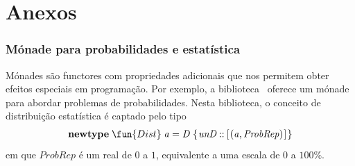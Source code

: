 \documentclass[a4paper]{article}
\newcommand{\Conid}[1]{\mathit{#1}}
\newcommand{\Varid}[1]{\mathit{#1}}
\begin{document}





\newpage

\part*{Anexos}

\appendix

\section{Mónade para probabilidades e estatística}\label{sec:Dist}
Mónades são functores com propriedades adicionais que nos permitem obter
efeitos especiais em progra\-mação. Por exemplo, a biblioteca \Probability\
oferece um mónade para abordar problemas de probabilidades. Nesta biblioteca,
o conceito de distribuição estatística é captado pelo tipo
\begin{eqnarray}
	\ensuremath{\mathbf{newtype}\;\fun{Dist}\;\Varid{a}\mathrel{=}\Conid{D}\;\{\mskip1.5mu \Varid{unD}\mathbin{::}[\mskip1.5mu (\Varid{a},\Conid{ProbRep})\mskip1.5mu]\mskip1.5mu\}}
	\label{eq:Dist}
\end{eqnarray}
em que \ensuremath{\Conid{ProbRep}} é um real de \ensuremath{\mathrm{0}} a \ensuremath{\mathrm{1}}, equivalente a uma escala de \ensuremath{\mathrm{0}} a \ensuremath{\mathrm{100}\mathbin{\%}}.
\end{document}
